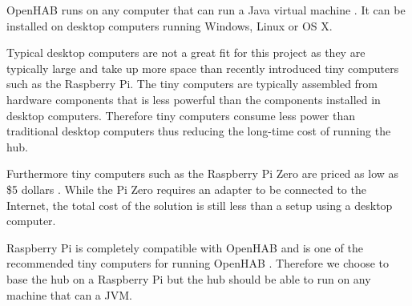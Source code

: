 OpenHAB runs on any computer that can run a Java virtual machine \cite{openhab:introduction}. It can be installed on desktop computers running Windows, Linux or OS X.

Typical desktop computers are not a great fit for this project as they are typically large and take up more space than recently introduced tiny computers such as the Raspberry Pi. The tiny computers are typically assembled from hardware components that is less powerful than the components installed in desktop computers. Therefore tiny computers consume less power than traditional desktop computers thus reducing the long-time cost of running the hub.

Furthermore tiny computers such as the Raspberry Pi Zero are priced as low as \$5 dollars \cite{raspberrypi:zero}. While the Pi Zero requires an adapter to be connected to the Internet, the total cost of the solution is still less than a setup using a desktop computer.

Raspberry Pi is completely compatible with OpenHAB and is one of the recommended tiny computers for running OpenHAB \cite{openhab:hardware}. Therefore we choose to base the hub on a Raspberry Pi but the hub should be able to run on any machine that can a JVM.

